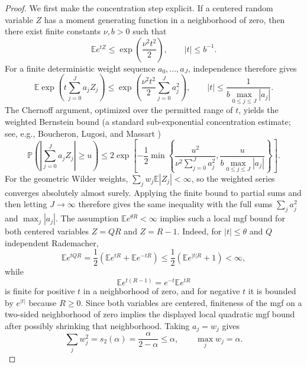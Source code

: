 \documentclass[11pt]{article}
\newcommand{\E}{\mathbb E}
\newcommand{\Prob}{\mathbb P}
\begin{document}
\begin{proof}
We first make the concentration step explicit. If a centered random variable $Z$
has a moment generating function in a neighborhood of zero, then there exist
finite constants $\nu,b>0$ such that
\begin{equation}
\E e^{tZ}\le \exp\!\left(\frac{\nu^2t^2}{2}\right),
\qquad |t|\le b^{-1}.
\end{equation}
For a finite deterministic weight sequence $a_0,\ldots,a_J$, independence therefore gives
\begin{equation}
\E\exp\!\left(t\sum_{j=0}^J a_jZ_j\right)
\le \exp\!\left(\frac{\nu^2t^2}{2}\sum_{j=0}^J a_j^2\right),
\qquad
|t|\le \frac{1}{b\max_{0\le j\le J}|a_j|}.
\end{equation}
The Chernoff argument, optimized over the permitted range of $t$, yields the
weighted Bernstein bound (a standard sub-exponential concentration estimate; see, e.g., Boucheron, Lugosi, and Massart \cite{boucheron2013})
\begin{equation}
\Prob\!\left(\left|\sum_{j=0}^J a_jZ_j\right|\ge u\right)
\le 2\exp\!\left[-\frac12
\min\!\left\{\frac{u^2}{\nu^2\sum_{j=0}^J a_j^2},
\frac{u}{b\max_{0\le j\le J}|a_j|}\right\}\right].
\end{equation}
For the geometric Wilder weights, $\sum_jw_j\E|Z_j|<\infty$, so the weighted
series converges absolutely almost surely. Applying the finite bound to partial
sums and then letting $J\to\infty$ therefore gives the same inequality with the
full sums $\sum_j a_j^2$ and $\max_j|a_j|$.
The assumption $\E e^{\theta R}<\infty$ implies such a local mgf bound for
both centered variables $Z=QR$ and $Z=R-1$. Indeed, for $|t|\le\theta$ and $Q$ independent Rademacher,
\begin{equation}
\E e^{tQR}=\frac12\left(\E e^{tR}+\E e^{-tR}\right)
\le \frac12\left(\E e^{|t|R}+1\right)<\infty,
\end{equation}
while
\begin{equation}
\E e^{t(R-1)}=e^{-t}\E e^{tR}
\end{equation}
is finite for positive $t$ in a neighborhood of zero, and for negative $t$ it is bounded by $e^{|t|}$ because $R\ge0$. Since both variables are centered, finiteness of the mgf on a two-sided neighborhood of zero implies the displayed local quadratic mgf bound after possibly shrinking that neighborhood. Taking $a_j=w_j$ gives
\begin{equation}
\sum_jw_j^2=s_2(\alpha)=\frac{\alpha}{2-\alpha}\le\alpha,
\qquad
\max_jw_j=\alpha.
\end{equation}

\end{proof}
\end{document}
